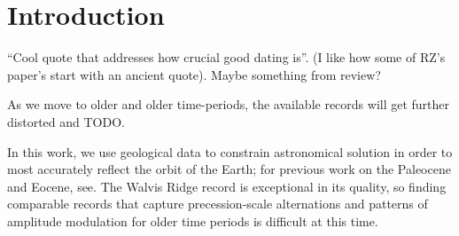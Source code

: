 \documentclass[draft]{agujournal2019}
\begin{document}
%
%
%
%





\section{Introduction}\label{sec:intro}

``Cool quote that addresses how crucial good dating is''.
(I like how some of RZ's paper's start with an ancient quote).
Maybe something from  review?

As we move to older and older time-periods, the available records will get further distorted and TODO.

In this work, we use geological data to constrain astronomical solution in order to most accurately reflect the orbit of the Earth; for previous work on the Paleocene and Eocene, see.
The Walvis Ridge record is exceptional in its quality, so finding comparable records that capture precession-scale alternations and patterns of amplitude modulation for older time periods is difficult at this time.
\end{document}
